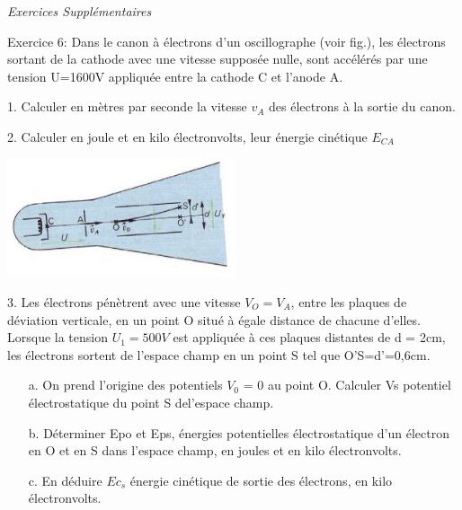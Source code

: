 \documentclass[12pt, french]{article}
\begin{document}
\vspace{2cm}
\begin{center}
   \Large{ \em{Exercices Supplémentaires}}
\end{center}
\begin{Box2}{Exercice 6:}
Dans le canon à électrons d’un oscillographe (voir fig.), les électrons sortant de la cathode avec une vitesse
supposée nulle, sont accélérés par une tension U=1600V appliquée entre la cathode C et l’anode A.

1. Calculer en mètres par seconde la vitesse $v_A$ des électrons à la sortie du canon.
   
2. Calculer en joule et en kilo électronvolts, leur énergie cinétique $E_{CA}$
   \begin{center}
    \includegraphics[width=0.5\textwidth]{./img/img_02.png}
      \end{center}
   3. Les électrons pénètrent avec une vitesse $V_O = V_A$, entre les plaques de déviation verticale, en un point O
situé à égale distance de chacune d’elles. Lorsque la tension $U_1 = 500V$ est appliquée à ces plaques
distantes de d = 2cm, les électrons sortent de l’espace champ en un point S tel que O’S=d’=0,6cm.
   \begin{enumerate}
      \item[a.] On prend l’origine des potentiels $V_0$ = 0 au point O. Calculer Vs potentiel électrostatique du point S del’espace champ.

      \item[b.] Déterminer Epo et Eps, énergies potentielles électrostatique d’un électron en O et en S dans l’espace champ, en joules et en kilo électronvolts.

      \item[c.] En déduire $Ec_s$ énergie cinétique de sortie des électrons, en kilo électronvolts.
   \end{enumerate}
\end{Box2}
\end{document}
